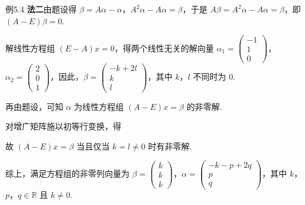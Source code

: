 \begin{fcard}{例5.4}
\textbf{法二}\quad 由题设得 $\beta=A\alpha-\alpha$，$A^{2}\alpha-A\alpha=\beta$，于是 $A\beta=A^{2}\alpha-A\alpha=\beta$，即 $(A-E)\beta=0$.

解线性方程组 $(E-A)x=0$，得两个线性无关的解向量 $\alpha_1=\begin{pmatrix}-1\\1\\0\end{pmatrix}$，$\alpha_2=\begin{pmatrix}2\\0\\1\end{pmatrix}$，因此，$\beta=\begin{pmatrix}-k+2l\\k\\l\end{pmatrix}$，其中 $k$，$l$ 不同时为 0.

再由题设，可知 $\alpha$ 为线性方程组 $(A-E)x=\beta$ 的非零解.

对增广矩阵施以初等行变换，得


故 $(A-E)x=\beta$ 当且仅当 $k=l\ne0$ 时有非零解.

综上，满足方程组的非零列向量为 $\beta=\begin{pmatrix}k\\k\\k\end{pmatrix}$，$\alpha=\begin{pmatrix}-k-p+2q\\p\\q\end{pmatrix}$，其中 $k$，$p$，$q\in\mathbb{R}$ 且 $k\ne0$.
\end{fcard}

